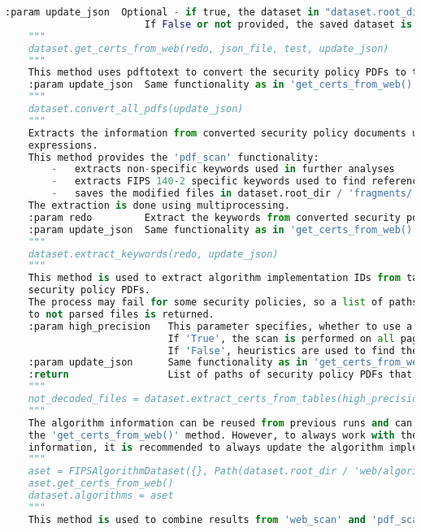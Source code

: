 \begin{lstlisting}[language=python,caption=Example of using FIPS 140-2 functionality of \texttt{sec-certs}, label={code}]
    :param update_json  Optional - if true, the dataset in "dataset.root_dir / 'fips_full_dataset.json'" is updated at the end of this method.
                        If False or not provided, the saved dataset is not updated.                    
    """
    dataset.get_certs_from_web(redo, json_file, test, update_json)
    """
    This method uses pdftotext to convert the security policy PDFs to text files.
    :param update_json  Same functionality as in 'get_certs_from_web()' method.
    """
    dataset.convert_all_pdfs(update_json)
    """
    Extracts the information from converted security policy documents using regular 
    expressions.
    This method provides the 'pdf_scan' functionality:
        -   extracts non-specific keywords used in further analyses
        -   extracts FIPS 140-2 specific keywords used to find references
        -   saves the modified files in dataset.root_dir / 'fragments/' directory
    The extraction is done using multiprocessing. 
    :param redo         Extract the keywords from converted security policies from scratch.
    :param update_json  Same functionality as in 'get_certs_from_web()' method.
    """
    dataset.extract_keywords(redo, update_json)
    """
    This method is used to extract algorithm implementation IDs from tables in 
    security policy PDFs.
    The process may fail for some security policies, so a list of paths
    to not parsed files is returned.
    :param high_precision   This parameter specifies, whether to use a heuristic to find the pages with tables in the PDF, scanning only them. However, this is often not extensive and the results are not precise for some certificates.
                            If 'True', the scan is performed on all pages of every PDF.
                            If 'False', heuristics are used to find the pages containing tables.
    :param update_json      Same functionality as in 'get_certs_from_web()' method.
    :return                 List of paths of security policy PDFs that were not parsed.
    """
    not_decoded_files = dataset.extract_certs_from_tables(high_precision, update_json)
    """
    The algorithm information can be reused from previous runs and can be loaded in 
    the 'get_certs_from_web()' method. However, to always work with the most recent 
    information, it is recommended to always update the algorithm implementation dataset.
    """
    aset = FIPSAlgorithmDataset({}, Path(dataset.root_dir / 'web/algorithms'), 'algorithms', 'sample algs')
    aset.get_certs_from_web()
    dataset.algorithms = aset
    """
    This method is used to combine results from 'web_scan' and 'pdf_scan'.

\end{lstlisting}
